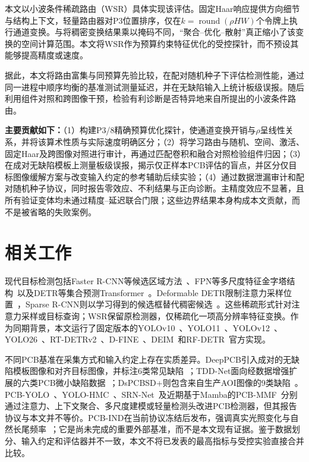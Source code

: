 \documentclass[conference]{IEEEtran}
\begin{document}
本文以小波条件稀疏路由（WSR）具体实现该评估。固定Haar响应提供方向细节与结构上下文，轻量路由器对P3位置排序，仅在$k=\operatorname{round}(\rho HW)$个令牌上执行通道变换。与将稠密变换结果乘以掩码不同，“聚合--优化--散射”真正缩小了该变换的空间计算范围。本文将WSR作为预算约束特征优化的受控探针，而不预设其能够提高精度或速度。

据此，本文将路由富集与同预算先验比较，在配对随机种子下评估检测性能，通过同一进程中顺序均衡的基准测试测量延迟，并在无缺陷输入上统计板级误报。随后利用组件对照和跨图像干预，检验有利诊断是否特异地来自所提出的小波条件路由。

\textbf{主要贡献如下：}（1）构建P3/8精确预算优化探针，使通道变换开销与$\rho$呈线性关系，并将该算术性质与实际速度明确区分；（2）将学习路由与随机、空间、激活、固定Haar及跨图像对照进行审计，再通过匹配卷积和融合对照检验组件归因；（3）在成对无缺陷模板上测量板级误报，揭示仅正样本PCB评估的盲点，并区分仅目标图像缓解方案与改变输入约定的参考辅助后续实验；（4）通过数据泄漏审计和配对随机种子协议，同时报告零效应、不利结果与正向诊断。主精度效应不显著，且所有验证变体均未通过精度--延迟联合门限；这些边界结果本身构成本文贡献，而不是被省略的失败案例。

\section{相关工作}
现代目标检测包括Faster R-CNN等候选区域方法~\cite{fasterrcnn}、FPN等多尺度特征金字塔结构~\cite{fpn}以及DETR等集合预测Transformer~\cite{detr}。Deformable DETR限制注意力采样位置~\cite{deformabledetr}，Sparse R-CNN则以学习得到的候选框替代稠密候选~\cite{sparsercnn}。这些稀疏形式针对注意力采样或目标查询；WSR保留原检测器，仅稀疏化一项高分辨率特征变换。作为同期背景，本文运行了固定版本的YOLOv10~\cite{yolov10}、YOLO11~\cite{yolo11}、YOLOv12~\cite{yolov12}、YOLO26~\cite{yolo26}、RT-DETRv2~\cite{rtdetrv2}、D-FINE~\cite{dfine}、DEIM~\cite{deim}和RF-DETR~\cite{rfdetr}官方实现。

不同PCB基准在采集方式和输入约定上存在实质差异。DeepPCB引入成对的无缺陷模板图像和对齐目标图像，并标注6类常见缺陷~\cite{deeppcb}；TDD-Net面向经数据增强扩展的六类PCB微小缺陷数据~\cite{tddnet}；DsPCBSD+则包含来自生产AOI图像的9类缺陷~\cite{dspcbsd}。PCB-YOLO~\cite{pcbyolo}、YOLO-HMC~\cite{yolohmc}、SRN-Net~\cite{srnnet}及近期基于Mamba的PCB-MMF~\cite{pcbmmf}分别通过注意力、上下文聚合、多尺度建模或轻量检测头改进PCB检测器，但其报告协议与本文并不等价。PCB-IND在当前协议冻结后发布，强调真实光照变化与自然长尾频率~\cite{pcbind}；它是尚未完成的重要外部基准，而不是本文现有证据。鉴于数据划分、输入约定和评估器并不一致，本文不将已发表的最高指标与受控实验直接合并比较。
\end{document}
